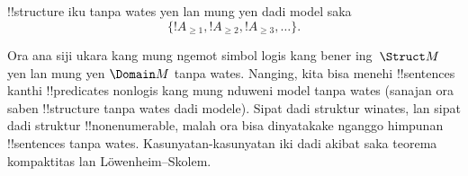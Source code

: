 \documentclass[../../../include/open-logic-section]{subfiles}
\begin{document}
\begin{prop}
!!{structure} iku tanpa wates yen lan mung
yen dadi model saka
\[
\{!A_{\ge 1}, !A_{\ge 2}, !A_{\ge 3}, \dots \}.
\]
\end{prop}

Ora ana siji ukara kang mung ngemot simbol logis
kang bener ing~$\Struct M$ yen lan mung yen
$\Domain M$ tanpa wates. Nanging, kita bisa
menehi !!{sentence}s kanthi !!{predicate}s
nonlogis kang mung nduweni model tanpa wates
(sanajan ora saben !!{structure} tanpa wates
dadi modele). Sipat dadi struktur winates, lan
sipat dadi struktur !!{nonenumerable}, malah
ora bisa dinyatakake nganggo himpunan
!!{sentence}s tanpa wates. Kasunyatan-kasunyatan
iki dadi akibat saka teorema kompaktitas lan
L\"owenheim--Skolem.
\end{document}
